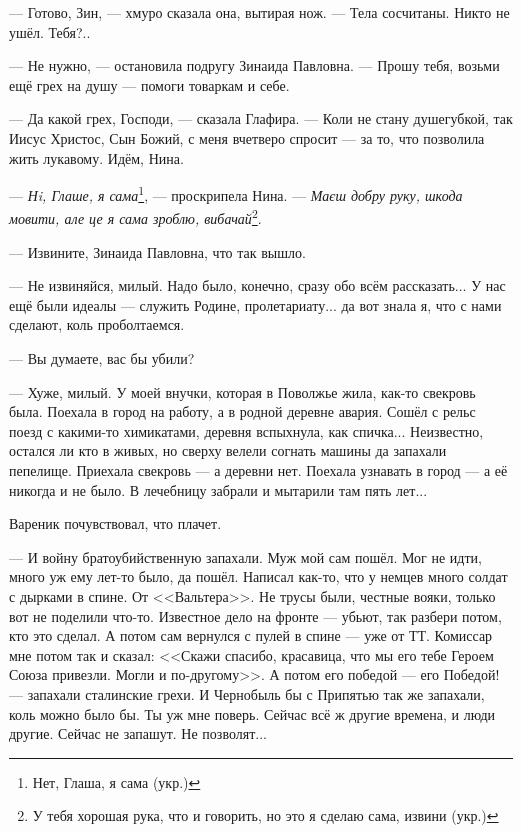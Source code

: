 --- Готово, Зин, --- хмуро сказала она, вытирая нож.
--- Тела сосчитаны.
Никто не ушёл.
Тебя?..

--- Не нужно, --- остановила подругу Зинаида Павловна.
--- Прошу тебя, возьми ещё грех на душу --- помоги товаркам и себе.

--- Да какой грех, Господи, --- сказала Глафира.
--- Коли не стану душегубкой, так Иисус Христос, Сын Божий, с меня вчетверо спросит --- за то, что позволила жить лукавому.
Идём, Нина.

--- \textit{Нi, Глаше, я сама}\footnote{Нет, Глаша, я сама (укр.)}, --- проскрипела Нина.
--- \textit{Маєш добру руку, шкода мовити, але це я сама зроблю, вибачай}\footnote{У тебя хорошая рука, что и говорить, но это я сделаю сама, извини (укр.)}.

\asterism

\textspace

--- Извините, Зинаида Павловна, что так вышло.

--- Не извиняйся, милый.
Надо было, конечно, сразу обо всём рассказать...
У нас ещё были идеалы --- служить Родине, пролетариату... да вот знала я, что с нами сделают, коль проболтаемся.

--- Вы думаете, вас бы убили?

--- Хуже, милый.
У моей внучки, которая в Поволжье жила, как-то свекровь была.
Поехала в город на работу, а в родной деревне авария.
Сошёл с рельс поезд с какими-то химикатами, деревня вспыхнула, как спичка...
Неизвестно, остался ли кто в живых, но сверху велели согнать машины да запахали пепелище.
Приехала свекровь --- а деревни нет.
Поехала узнавать в город --- а её никогда и не было.
В лечебницу забрали и мытарили там пять лет...

Вареник почувствовал, что плачет.

--- И войну братоубийственную запахали.
Муж мой сам пошёл.
Мог не идти, много уж ему лет-то было, да пошёл.
Написал как-то, что у немцев много солдат с дырками в спине.
От <<Вальтера>>.
Не трусы были, честные вояки, только вот не поделили что-то.
Известное дело на фронте --- убьют, так разбери потом, кто это сделал.
А потом сам вернулся с пулей в спине --- уже от ТТ.
Комиссар мне потом так и сказал: <<Скажи спасибо, красавица, что мы его тебе Героем Союза привезли.
Могли и по-другому>>.
А потом его победой --- его Победой! --- запахали сталинские грехи.
И Чернобыль бы с Припятью так же запахали, коль можно было бы.
Ты уж мне поверь.
Сейчас всё ж другие времена, и люди другие.
Сейчас не запашут.
Не позволят...

